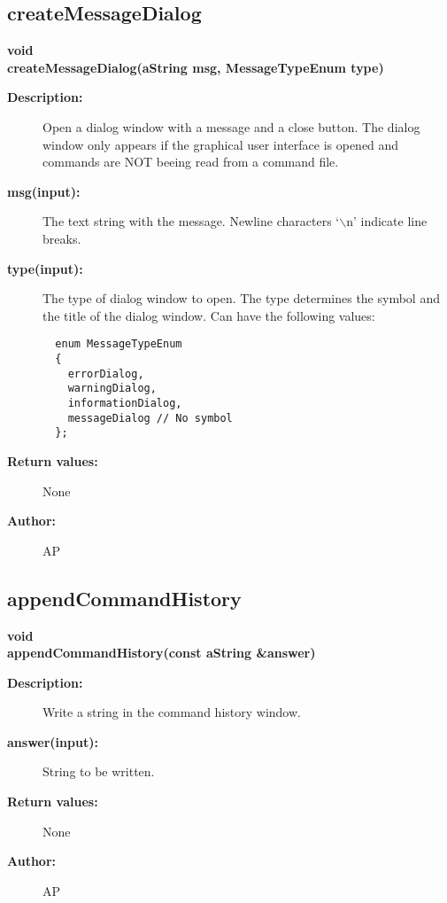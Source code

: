 \subsection{createMessageDialog}
 
\begin{flushleft} \textbf{%
void  \\ 
\settowidth{\GLGraphicsInterfaceIncludeArgIndent}{createMessageDialog(}%
createMessageDialog(aString msg, MessageTypeEnum type)
}\end{flushleft}
\begin{description}
\item[{\bf Description:}] 
 Open a dialog window with a message and a close button. The dialog window only appears
 if the graphical user interface is opened and commands are NOT beeing read from a command file.

\item[{\bf msg(input):}]  The text string with the message. Newline characters `$\backslash$n' indicate line
 breaks.
\item[{\bf type(input):}]  The type of dialog window to open. The type determines the symbol and the title
 of the dialog window. Can have the following values:
   \begin{verbatim}
  enum MessageTypeEnum 
  {
    errorDialog,
    warningDialog,
    informationDialog,
    messageDialog // No symbol
  };
   \end{verbatim}

\item[{\bf Return values:}]  None
\item[{\bf Author:}]  AP
\end{description}
\subsection{appendCommandHistory}
 
\begin{flushleft} \textbf{%
void  \\ 
\settowidth{\GLGraphicsInterfaceIncludeArgIndent}{appendCommandHistory(}%
appendCommandHistory(const aString \&answer)
}\end{flushleft}
\begin{description}
\item[{\bf Description:}] 
 Write a string in the command history window.
\item[{\bf answer(input):}]  String to be written.
\item[{\bf Return values:}]  None
\item[{\bf Author:}]  AP
\end{description}
